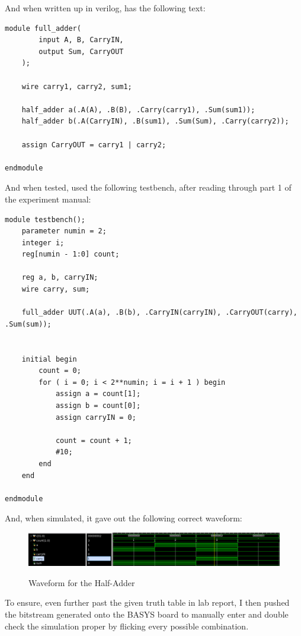 And when written up in verilog, has the following text:
\begin{lstlisting}[label={label}, style=Verilog]
module full_adder(
        input A, B, CarryIN,
        output Sum, CarryOUT
    );
    
    wire carry1, carry2, sum1;
    
    half_adder a(.A(A), .B(B), .Carry(carry1), .Sum(sum1));
    half_adder b(.A(CarryIN), .B(sum1), .Sum(Sum), .Carry(carry2));
    
    assign CarryOUT = carry1 | carry2; 
    
endmodule
\end{lstlisting}
\newpage
And when tested, used the following testbench, after reading through part 1 of the experiment manual:
\begin{lstlisting}[label={label}, style=Verilog]
module testbench();
    parameter numin = 2;
    integer i;
    reg[numin - 1:0] count;
    
    reg a, b, carryIN;
    wire carry, sum;
    
    full_adder UUT(.A(a), .B(b), .CarryIN(carryIN), .CarryOUT(carry), .Sum(sum));

    
    initial begin
        count = 0;
        for ( i = 0; i < 2**numin; i = i + 1 ) begin
            assign a = count[1];
            assign b = count[0];
            assign carryIN = 0;
            
            count = count + 1;
            #10;
        end
    end
    
endmodule
\end{lstlisting}

And, when simulated, it gave out the following correct waveform:
\begin{figure}[!htbp]
    \centering
    \caption{Waveform for the Half-Adder}
    \includegraphics[width=1\textwidth]{part-1-full-waveform.png}
    \label{Figure 2}
\end{figure}

To ensure, even further past the given truth table in lab report, I then pushed the bitstream generated onto the BASYS board to manually enter and double check the simulation proper by flicking every possible combination.
\newpage


